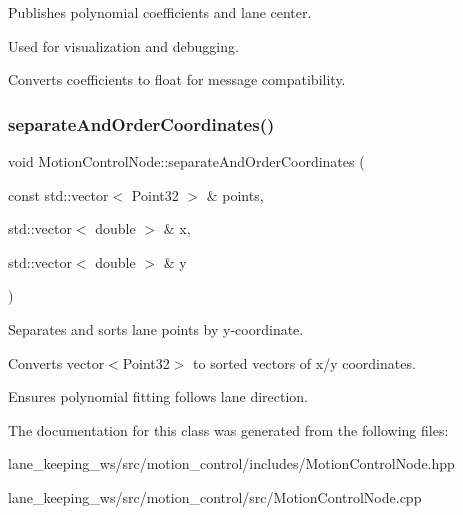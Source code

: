 Publishes polynomial coefficients and lane center. 


\begin{DoxyItemize}
\item Used for visualization and debugging.
\item Converts coefficients to float for message compatibility. 
\end{DoxyItemize}\mbox{\label{classMotionControlNode_a67cc5bcda286ffbe809d0555bdaf6a8d}} 
\subsubsection{\texorpdfstring{separate\+And\+Order\+Coordinates()}{separateAndOrderCoordinates()}}
{\footnotesize\ttfamily void Motion\+Control\+Node\+::separate\+And\+Order\+Coordinates (\begin{DoxyParamCaption}\item[{const std\+::vector$<$ Point32 $>$ \&}]{points,  }\item[{std\+::vector$<$ double $>$ \&}]{x,  }\item[{std\+::vector$<$ double $>$ \&}]{y }\end{DoxyParamCaption})\hspace{0.3cm}{\ttfamily [private]}}



Separates and sorts lane points by y-\/coordinate. 


\begin{DoxyItemize}
\item Converts vector$<$\+Point32$>$ to sorted vectors of x/y coordinates.
\item Ensures polynomial fitting follows lane direction. 
\end{DoxyItemize}

The documentation for this class was generated from the following files\+:\begin{DoxyCompactItemize}
\item 
lane\+\_\+keeping\+\_\+ws/src/motion\+\_\+control/includes/Motion\+Control\+Node.\+hpp\item 
lane\+\_\+keeping\+\_\+ws/src/motion\+\_\+control/src/Motion\+Control\+Node.\+cpp\end{DoxyCompactItemize}
